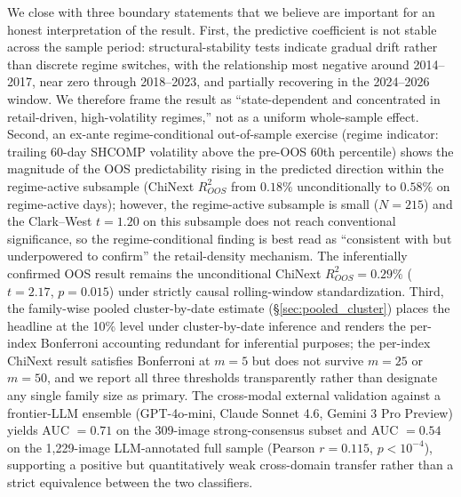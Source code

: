 \documentclass[AER]{AEA}
\begin{document}
We close with three boundary statements that we believe are important for an honest interpretation of the result. First, the predictive coefficient is not stable across the sample period: structural-stability tests indicate gradual drift rather than discrete regime switches, with the relationship most negative around 2014--2017, near zero through 2018--2023, and partially recovering in the 2024--2026 window. We therefore frame the result as ``state-dependent and concentrated in retail-driven, high-volatility regimes,'' not as a uniform whole-sample effect. Second, an ex-ante regime-conditional out-of-sample exercise (regime indicator: trailing 60-day SHCOMP volatility above the pre-OOS 60th percentile) shows the magnitude of the OOS predictability rising in the predicted direction within the regime-active subsample (ChiNext $R^2_{OOS}$ from $0.18\%$ unconditionally to $0.58\%$ on regime-active days); however, the regime-active subsample is small ($N=215$) and the Clark--West $t = 1.20$ on this subsample does not reach conventional significance, so the regime-conditional finding is best read as ``consistent with but underpowered to confirm'' the retail-density mechanism. The inferentially confirmed OOS result remains the unconditional ChiNext $R^2_{OOS}=0.29\%$ ($t=2.17$, $p=0.015$) under strictly causal rolling-window standardization. Third, the family-wise pooled cluster-by-date estimate (\S\ref{sec:pooled_cluster}) places the headline at the 10\% level under cluster-by-date inference and renders the per-index Bonferroni accounting redundant for inferential purposes; the per-index ChiNext result satisfies Bonferroni at $m=5$ but does not survive $m=25$ or $m=50$, and we report all three thresholds transparently rather than designate any single family size as primary. The cross-modal external validation against a frontier-LLM ensemble (GPT-4o-mini, Claude Sonnet 4.6, Gemini 3 Pro Preview) yields AUC $= 0.71$ on the 309-image strong-consensus subset and AUC $= 0.54$ on the 1{,}229-image LLM-annotated full sample (Pearson $r = 0.115$, $p < 10^{-4}$), supporting a positive but quantitatively weak cross-domain transfer rather than a strict equivalence between the two classifiers.
\end{document}

